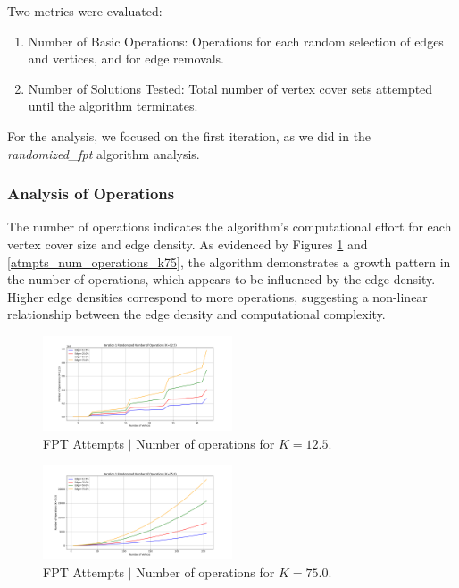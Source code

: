 Two metrics were evaluated:\begin{enumerate}
    \item Number of Basic Operations: Operations for each random selection of edges and vertices, and for edge removals.
    \item Number of Solutions Tested: Total number of vertex cover sets attempted until the algorithm terminates.
\end{enumerate}

For the analysis, we focused on the first iteration, as we did in the \textit{randomized\_fpt} algorithm analysis.

\subsubsection{Analysis of Operations}
The number of operations indicates the algorithm's computational effort for each vertex cover size and edge density. As evidenced by Figures \ref{fig:atmpts_num_operations_k12_5} and \ref{atmpts_num_operations_k75}, the algorithm demonstrates a growth pattern in the number of operations, which appears to be influenced by the edge density. Higher edge densities correspond to more operations, suggesting a non-linear relationship between the edge density and computational complexity.

\begin{figure}[h]
\centering
\includegraphics[width=0.5\textwidth]{FPT_attempts/Number of Operations (K=12.5).png}
\caption{FPT Attempts \(|\) Number of operations for \( K=12.5 \).}
\label{fig:atmpts_num_operations_k12_5}
\end{figure}

\begin{figure}[h]
\centering
\includegraphics[width=0.5\textwidth]{FPT/Number of Operations (K=75.0).png}
\caption{FPT Attempts \(|\) Number of operations for \( K=75.0 \).}
\label{fig:atmpts_num_operations_k75}
\end{figure}

